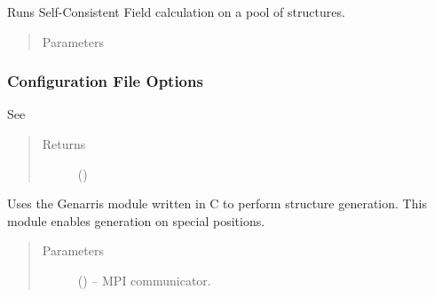 \documentclass[letterpaper,10pt,english]{sphinxmanual}
\begin{document}
\begin{fulllineitems}
\begin{fulllineitems}
\begin{quote}
\begin{description}
\end{description}\end{quote}

\end{fulllineitems}


\begin{fulllineitems}
\label{\detokenize{index:Genarris.genarris_master.Genarris.FHI_Aims_Energy_Evaluation}}
Runs Self-Consistent Field calculation on a pool of structures.
\begin{quote}\begin{description}
\item[{Parameters}] \leavevmode
{}

\end{description}\end{quote}
\subsubsection*{Configuration File Options}

See {\hyperref[\detokenize{index:Genarris.genarris_master.Genarris.Run_FHI_Aims_Batch}]{}}
\begin{quote}\begin{description}
\item[{Returns}] \leavevmode
{} ()

\end{description}\end{quote}

\end{fulllineitems}


\begin{fulllineitems}
\label{\detokenize{index:Genarris.genarris_master.Genarris.Pygenarris_Structure_Generation}}
Uses the Genarris module written in C to perform structure generation.
This module enables generation on special positions.
\begin{quote}\begin{description}
\item[{Parameters}] \leavevmode
{} () -- MPI communicator.


\end{description}
\end{quote}
\end{fulllineitems}
\end{fulllineitems}
\end{document}
